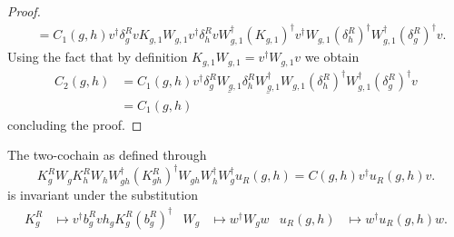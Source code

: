 \documentclass[12pt,a4paper,twoside]{article}
\numberwithin{equation}{section}
\begin{document}
\begin{proof}
\begin{align}
		&=C_1(g,h)v^\dagger \delta_g^R v K_{g,1} W_{g,1}v^\dagger \delta_h^R v W_{g,1}^\dagger (K_{g,1})^\dagger v^\dagger W_{g,1}(\delta^R_h)^\dagger W_{g,1}^\dagger(\delta_g^R)^\dagger v.
	\end{align}
	Using the fact that by definition $K_{g,1}W_{g,1}=v^\dagger W_{g,1}v$ we obtain
	\begin{align}
		C_2(g,h)&=C_1(g,h)v^\dagger \delta_g^R \underline{W_{g,1}} \delta_h^R \underline{W_{g,1}^\dagger} W_{g,1}(\delta^R_h)^\dagger W_{g,1}^\dagger(\delta_g^R)^\dagger v\\
		&=C_1(g,h)
	\end{align}
	concluding the proof.
\end{proof}
\begin{lemma}\label{lem:2cochainIsInvariant}
	The two-cochain as defined through
	\begin{equation}\label{eq:Definition2Cochain2TranslationSectionAppendix}
		K_g^RW_gK_h^RW_hW_{gh}^\dagger(K_{gh}^R)^\dagger W_{gh}W_{h}^\dagger W_g^\dagger u_R(g,h)=C(g,h)v^\dagger u_R(g,h)v.
	\end{equation}
	is invariant under the substitution
	\begin{align}
		K_g^R&\mapsto v^\dagger b_g^R v h_g K_g^R (b_g^R)^\dagger&W_g&\mapsto w^\dagger W_g w&u_R(g,h)&\mapsto w^\dagger u_R(g,h)w.
	\end{align}
\end{lemma}
\end{document}
